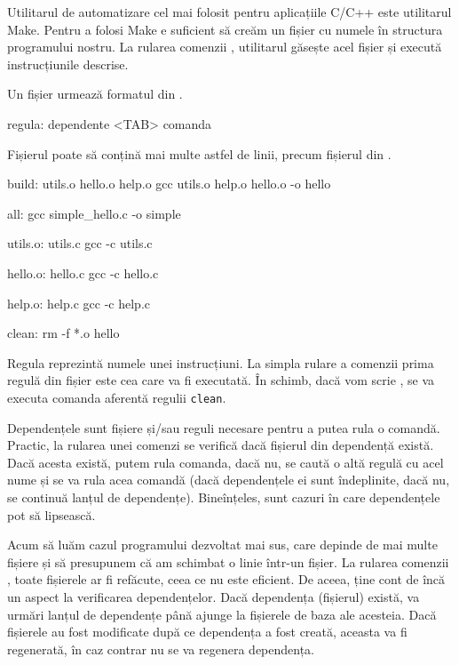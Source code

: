 Utilitarul de automatizare cel mai folosit pentru aplicațiile C/C++ este utilitarul Make.
Pentru a folosi Make e suficient să creăm un fișier cu numele  în
structura programului nostru. La rularea comenzii , utilitarul găsește
acel fișier și execută instrucțiunile descrise.

Un fișier  urmează formatul din .

\begin{screen}[caption={Formatul unui fișier Maefile},label={lst:appdev:makefile-format}]
regula: dependente
<TAB> comanda
\end{screen}

Fișierul poate să conțină mai multe astfel de linii, precum fișierul  din .

\begin{screen}[caption={Exemplu Makefile},label={lst:appdev:makefile}]
build: utils.o hello.o help.o
       gcc utils.o help.o hello.o -o hello

all:
       gcc simple_hello.c -o simple

utils.o: utils.c
       gcc -c utils.c

hello.o: hello.c
       gcc -c hello.c

help.o: help.c
       gcc -c help.c

clean:
       rm -f *.o hello
\end{screen}

Regula reprezintă numele unei instrucțiuni. La simpla rulare a comenzii 
prima regulă din fișier este cea care va fi executată. În schimb, dacă vom scrie
, se va executa comanda aferentă regulii \texttt{clean}.

Dependențele sunt fișiere și/sau reguli necesare pentru a putea rula o comandă.
Practic, la rularea unei comenzi se verifică dacă fișierul din dependență există.
Dacă acesta există, putem rula comanda, dacă nu, se caută o altă regulă cu acel
nume și se va rula acea comandă (dacă dependențele ei sunt îndeplinite, dacă nu,
se continuă lanțul de dependențe). Bineînțeles, sunt cazuri în care dependențele
pot să lipsească.

Acum să luăm cazul programului dezvoltat mai sus, care depinde de mai multe
fișiere și să presupunem că am schimbat o linie într-un fișier. La rularea
comenzii , toate fișierele ar fi refăcute, ceea ce nu este eficient. De
aceea,  ține cont de încă un aspect la verificarea dependențelor. Dacă
dependența (fișierul) există,  va urmări lanțul de dependențe până ajunge la
fișierele de baza ale acesteia. Dacă fișierele au fost modificate după ce
dependența a fost creată, aceasta va fi regenerată, în caz contrar nu se va
regenera dependența.

